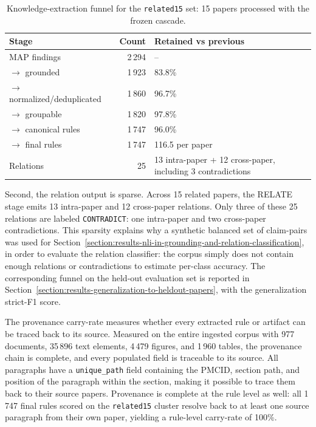\begin{table}[htpb]
    \caption[Knowledge-extraction funnel]{Knowledge-extraction funnel for the \texttt{related15} set: 15 papers processed with the frozen cascade.}
    \label{tab:knowledge-extraction-funnel}
    \centering
    \small
    \begin{tabular}{@{}l r l@{}}
        \toprule
        Stage & Count & Retained vs previous \\
        \midrule
        MAP findings
            & 2\,294
            & -- \\
        $\rightarrow$ grounded
            & 1\,923
            & 83.8\% \\
        $\rightarrow$ normalized/deduplicated
            & 1\,860
            & 96.7\% \\
        $\rightarrow$ groupable
            & 1\,820
            & 97.8\% \\
        $\rightarrow$ canonical rules
            & 1\,747
            & 96.0\% \\
        $\rightarrow$ final rules
            & 1\,747
            & 116.5 per paper \\
        Relations
            & 25
            & 13 intra-paper + 12 cross-paper, including 3 contradictions \\
        \bottomrule
    \end{tabular}
\end{table}

Second, the relation output is sparse. Across 15 related papers, the RELATE stage emits 13 intra-paper and 12 cross-paper relations. Only three of these 25 relations are labeled \texttt{CONTRADICT}: one intra-paper and two cross-paper contradictions. This sparsity explains why a synthetic balanced set of claim-pairs was used for Section~\ref{section:results-nli-in-grounding-and-relation-classification}, in order to evaluate the relation classifier: the corpus simply does not contain enough relations or contradictions to estimate per-class accuracy. The corresponding funnel on the held-out evaluation set is reported in Section~\ref{section:results-generalization-to-heldout-papers}, with the generalization strict-F1 score.

The provenance carry-rate measures whether every extracted rule or artifact can be traced back to its source. Measured on the entire ingested corpus with 977 documents, 35\,896 text elements, 4\,479 figures, and 1\,960 tables, the provenance chain is complete, and every populated field is traceable to its source. All paragraphs have a \texttt{unique\_path} field containing the PMCID, section path, and position of the paragraph within the section, making it possible to trace them back to their source papers. Provenance is complete at the rule level as well: all 1\,747 final rules scored on the \texttt{related15} cluster resolve back to at least one source paragraph from their own paper, yielding a rule-level carry-rate of 100\%.

